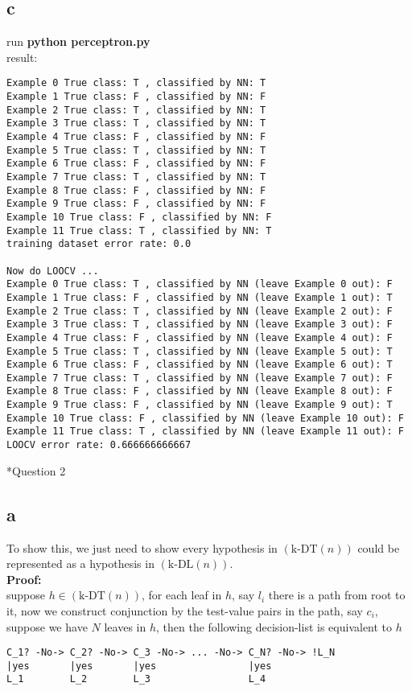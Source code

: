 \documentclass[12pt]{amsart}
\makeatletter
\renewcommand{\section}{\@startsection{section}{1}{0mm}
{-\baselineskip}{0.5\baselineskip}{\bf\leftline}}
\makeatother
\begin{document}
\subsection*{c}
run \textbf{python perceptron.py}\\
result:
\begin{verbatim}
Example 0 True class: T , classified by NN: T
Example 1 True class: F , classified by NN: F
Example 2 True class: T , classified by NN: T
Example 3 True class: T , classified by NN: T
Example 4 True class: F , classified by NN: F
Example 5 True class: T , classified by NN: T
Example 6 True class: F , classified by NN: F
Example 7 True class: T , classified by NN: T
Example 8 True class: F , classified by NN: F
Example 9 True class: F , classified by NN: F
Example 10 True class: F , classified by NN: F
Example 11 True class: T , classified by NN: T
training dataset error rate: 0.0

Now do LOOCV ...
Example 0 True class: T , classified by NN (leave Example 0 out): F
Example 1 True class: F , classified by NN (leave Example 1 out): T
Example 2 True class: T , classified by NN (leave Example 2 out): F
Example 3 True class: T , classified by NN (leave Example 3 out): F
Example 4 True class: F , classified by NN (leave Example 4 out): F
Example 5 True class: T , classified by NN (leave Example 5 out): T
Example 6 True class: F , classified by NN (leave Example 6 out): T
Example 7 True class: T , classified by NN (leave Example 7 out): F
Example 8 True class: F , classified by NN (leave Example 8 out): F
Example 9 True class: F , classified by NN (leave Example 9 out): T
Example 10 True class: F , classified by NN (leave Example 10 out): F
Example 11 True class: T , classified by NN (leave Example 11 out): F
LOOCV error rate: 0.666666666667
\end{verbatim}

\section*{Question 2}
\subsection*{a}
To show this, we just need to show every hypothesis in $(\mbox{k-DT}(n))$ could be 
represented as a hypothesis in $(\mbox{k-DL}(n))$.\\
\textbf{Proof:}\\
suppose $h\in (\mbox{k-DT}(n))$, for each leaf in $h$, say $l_i$ there is a path from root to it, now we construct conjunction by the test-value pairs in the path, say $c_i$, suppose we have $N$ leaves in $h$, then the following decision-list is equivalent to $h$
\begin{verbatim}
C_1? -No-> C_2? -No-> C_3 -No-> ... -No-> C_N? -No-> !L_N
|yes       |yes       |yes                |yes 
L_1        L_2        L_3                 L_4
\end{verbatim}
\end{document}

